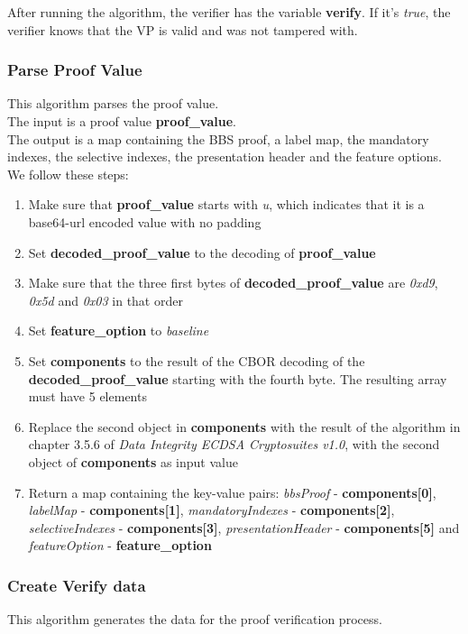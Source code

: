\documentclass[
	a4paper               %
	,BCOR=0mm            %
	,bibliography=totoc   %
	,listof=totoc         %
	,monolingual
	,twoside=false
]{bfhthesis}              %
\begin{document}
After running the algorithm, the verifier has the variable \textbf{verify}. If it's \textit{true}, the verifier knows that the VP is valid and was not tampered with.

\subsubsection{Parse Proof Value}
\label{subsub:parseproof}
This algorithm parses the proof value.\\

The input is a proof value \textbf{proof\_value}.\\

The output is a map containing the BBS proof, a label map, the mandatory indexes, the selective indexes, the presentation header and the feature options.\\

We follow these steps:
\begin{enumerate}
	\item Make sure that \textbf{proof\_value} starts with \textit{u}, which indicates that it is a base64-url encoded value with no padding
	\item Set \textbf{decoded\_proof\_value} to the decoding of \textbf{proof\_value}
	\item Make sure that the three first bytes of \textbf{decoded\_proof\_value} are \textit{0xd9}, \textit{0x5d} and \textit{0x03} in that order
	\item Set \textbf{feature\_option} to \textit{baseline}
	\item Set \textbf{components} to the result of the CBOR decoding of the \textbf{decoded\_proof\_value} starting with the fourth byte. The resulting array must have 5 elements
	\item Replace the second object in \textbf{components} with the result of the algorithm in chapter 3.5.6 of \textit{Data Integrity ECDSA Cryptosuites v1.0}\cite{ecdsa}, with the second object of \textbf{components} as input value
	\item Return a map containing the key-value pairs: \textit{bbsProof} - \textbf{components[0]}, \textit{labelMap} - \textbf{components[1]}, \textit{mandatoryIndexes} - \textbf{components[2]}, \textit{selectiveIndexes} - \textbf{components[3]}, \textit{presentationHeader} - \textbf{components[5]} and \textit{featureOption} - \textbf{feature\_option}
\end{enumerate}

\subsubsection{Create Verify data}
\label{subsub:createverifydata}
This algorithm generates the data for the proof verification process.\\
\end{document}

